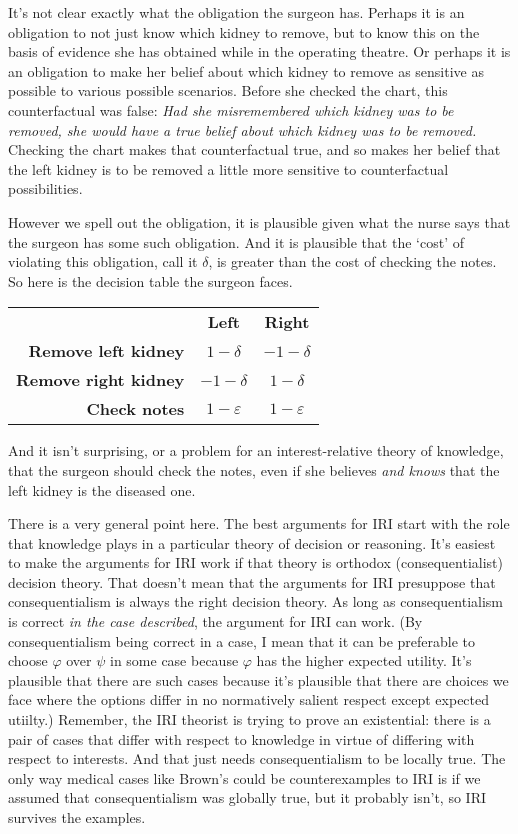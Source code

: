 \documentclass[oneside]{book}
\begin{document}
It's not clear exactly what the obligation the surgeon has. Perhaps it is an obligation to not just know which kidney to remove, but to know this on the basis of evidence she has obtained while in the operating theatre. Or perhaps it is an obligation to make her belief about which kidney to remove as sensitive as possible to various possible scenarios. Before she checked the chart, this counterfactual was false: \textit{Had she misremembered which kidney was to be removed, she would have a true belief about which kidney was to be removed.} Checking the chart makes that counterfactual true, and so makes her belief that the left kidney is to be removed a little more sensitive to counterfactual possibilities. 

However we spell out the obligation, it is plausible given what the nurse says that the surgeon has some such obligation. And it is plausible that the `cost' of violating this obligation, call it \(\delta\), is greater than the cost of checking the notes. So here is the decision table the surgeon faces.

\begin{center}
\begin{tabular}{r c c}
 & \textbf{Left} & \textbf{Right} \\
\textbf{Remove left kidney} & \(1-\delta\) & \(-1-\delta\) \\
\textbf{Remove right kidney} & \(-1-\delta\) & \(1-\delta\) \\
\textbf{Check notes} & \(1-\varepsilon\) & \(1-\varepsilon\) \\
\end{tabular}
\end{center}

\noindent And it isn't surprising, or a problem for an interest-relative theory of knowledge, that the surgeon should check the notes, even if she believes \textit{and knows} that the left kidney is the diseased one.

There is a very general point here. The best arguments for IRI start with the role that knowledge plays in a particular theory of decision or reasoning. It's easiest to make the arguments for IRI work if that theory is orthodox (consequentialist) decision theory. That doesn't mean that the arguments for IRI presuppose that consequentialism is always the right decision theory. As long as consequentialism is correct \textit{in the case described}, the argument for IRI can work. (By consequentialism being correct in a case, I mean that it can be preferable to choose $\varphi$ over $\psi$ in some case because $\varphi$ has the higher expected utility. It's plausible that there are such cases because it's plausible that there are choices we face where the options differ in no normatively salient respect except expected utiilty.) Remember, the IRI theorist is trying to prove an existential: there is a pair of cases that differ with respect to knowledge in virtue of differing with respect to interests. And that just needs consequentialism to be locally true. The only way medical cases like Brown's could be counterexamples to IRI is if we assumed that consequentialism was globally true, but it probably isn't, so IRI survives the examples.




\end{document}
